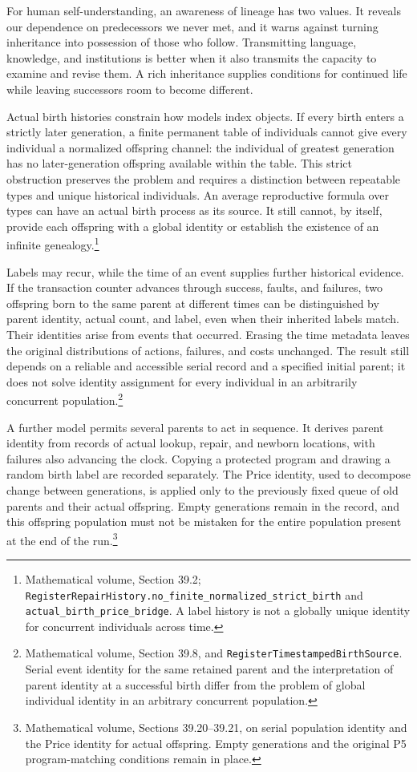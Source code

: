 \documentclass[
  english,
  11pt,
  oneside]{book}
\begin{document}
For human self-understanding, an awareness of lineage has two values. It reveals our dependence on predecessors we never met, and it warns against turning inheritance into possession of those who follow. Transmitting language, knowledge, and institutions is better when it also transmits the capacity to examine and revise them. A rich inheritance supplies conditions for continued life while leaving successors room to become different.

Actual birth histories constrain how models index objects. If every birth enters a strictly later generation, a finite permanent table of individuals cannot give every individual a normalized offspring channel: the individual of greatest generation has no later-generation offspring available within the table. This strict obstruction preserves the problem and requires a distinction between repeatable types and unique historical individuals. An average reproductive formula over types can have an actual birth process as its source. It still cannot, by itself, provide each offspring with a global identity or establish the existence of an infinite genealogy.\footnote{\hypertarget{ph-note-46}{}Mathematical volume, Section 39.2; \nolinkurl{RegisterRepairHistory.no_finite_normalized_strict_birth} and \nolinkurl{actual_birth_price_bridge}. A label history is not a globally unique identity for concurrent individuals across time.}

Labels may recur, while the time of an event supplies further historical evidence. If the transaction counter advances through success, faults, and failures, two offspring born to the same parent at different times can be distinguished by parent identity, actual count, and label, even when their inherited labels match. Their identities arise from events that occurred. Erasing the time metadata leaves the original distributions of actions, failures, and costs unchanged. The result still depends on a reliable and accessible serial record and a specified initial parent; it does not solve identity assignment for every individual in an arbitrarily concurrent population.\footnote{\hypertarget{ph-note-47}{}Mathematical volume, Section 39.8, and \nolinkurl{RegisterTimestampedBirthSource}. Serial event identity for the same retained parent and the interpretation of parent identity at a successful birth differ from the problem of global individual identity in an arbitrary concurrent population.}

A further model permits several parents to act in sequence. It derives parent identity from records of actual lookup, repair, and newborn locations, with failures also advancing the clock. Copying a protected program and drawing a random birth label are recorded separately. The Price identity, used to decompose change between generations, is applied only to the previously fixed queue of old parents and their actual offspring. Empty generations remain in the record, and this offspring population must not be mistaken for the entire population present at the end of the run.\footnote{\hypertarget{ph-note-48}{}Mathematical volume, Sections 39.20--39.21, on serial population identity and the Price identity for actual offspring. Empty generations and the original P5 program-matching conditions remain in place.}
\end{document}
